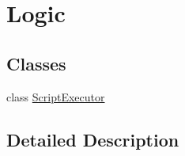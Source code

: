 \hypertarget{group__gr___logic}{}\section{Logic}
\label{group__gr___logic}
\subsection*{Classes}
\begin{DoxyCompactItemize}
\item 
class \hyperlink{class_script_executor}{Script\+Executor}
\end{DoxyCompactItemize}


\subsection{Detailed Description}

